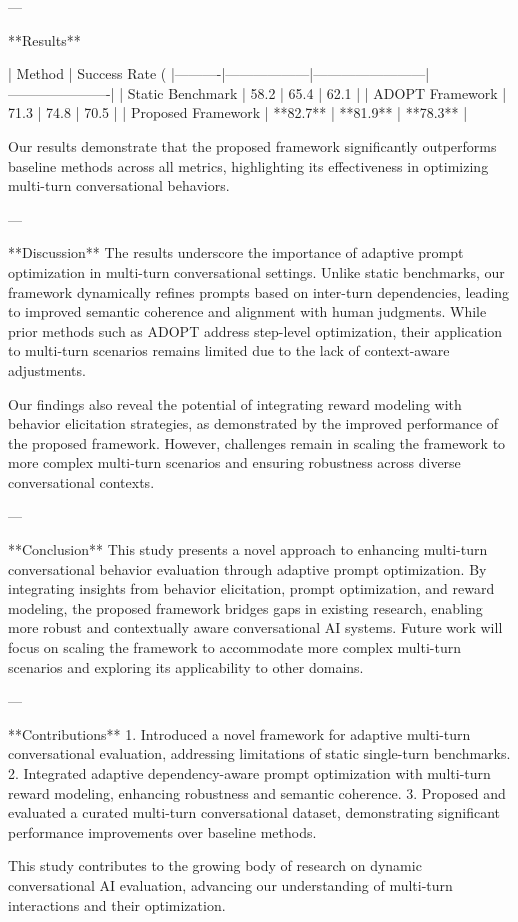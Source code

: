 ---

**Results**  

| Method   | Success Rate (%
|----------|------------------|------------------------|----------------------|  
| Static Benchmark | 58.2                | 65.4                   | 62.1                 |  
| ADOPT Framework  | 71.3                | 74.8                   | 70.5                 |  
| Proposed Framework | **82.7**            | **81.9**               | **78.3**             |  

Our results demonstrate that the proposed framework significantly outperforms baseline methods across all metrics, highlighting its effectiveness in optimizing multi-turn conversational behaviors.  

---

**Discussion**  
The results underscore the importance of adaptive prompt optimization in multi-turn conversational settings. Unlike static benchmarks, our framework dynamically refines prompts based on inter-turn dependencies, leading to improved semantic coherence and alignment with human judgments. While prior methods such as ADOPT address step-level optimization, their application to multi-turn scenarios remains limited due to the lack of context-aware adjustments.  

Our findings also reveal the potential of integrating reward modeling with behavior elicitation strategies, as demonstrated by the improved performance of the proposed framework. However, challenges remain in scaling the framework to more complex multi-turn scenarios and ensuring robustness across diverse conversational contexts.  

---

**Conclusion**  
This study presents a novel approach to enhancing multi-turn conversational behavior evaluation through adaptive prompt optimization. By integrating insights from behavior elicitation, prompt optimization, and reward modeling, the proposed framework bridges gaps in existing research, enabling more robust and contextually aware conversational AI systems. Future work will focus on scaling the framework to accommodate more complex multi-turn scenarios and exploring its applicability to other domains.  

---

**Contributions**  
1. Introduced a novel framework for adaptive multi-turn conversational evaluation, addressing limitations of static single-turn benchmarks.  
2. Integrated adaptive dependency-aware prompt optimization with multi-turn reward modeling, enhancing robustness and semantic coherence.  
3. Proposed and evaluated a curated multi-turn conversational dataset, demonstrating significant performance improvements over baseline methods.  

This study contributes to the growing body of research on dynamic conversational AI evaluation, advancing our understanding of multi-turn interactions and their optimization.  